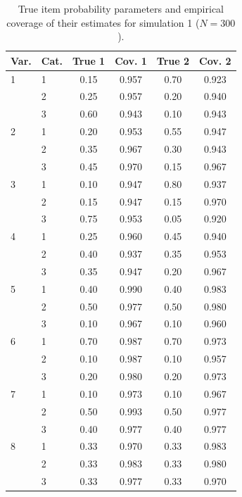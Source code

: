 \begin{table}[H]
\centering
\begin{tabular}{llcccc}
  \toprule
\textbf{Var.} & \textbf{Cat.} & \textbf{True 1} & \textbf{Cov. 1} & \textbf{True 2} & \textbf{Cov. 2} \\ 
  \midrule
1 & 1 & 0.15 & 0.957 & 0.70 & 0.923 \\ 
   & 2 & 0.25 & 0.957 & 0.20 & 0.940 \\ 
   & 3 & 0.60 & 0.943 & 0.10 & 0.943 \\ 
  2 & 1 & 0.20 & 0.953 & 0.55 & 0.947 \\ 
   & 2 & 0.35 & 0.967 & 0.30 & 0.943 \\ 
   & 3 & 0.45 & 0.970 & 0.15 & 0.967 \\ 
  3 & 1 & 0.10 & 0.947 & 0.80 & 0.937 \\ 
   & 2 & 0.15 & 0.947 & 0.15 & 0.970 \\ 
   & 3 & 0.75 & 0.953 & 0.05 & 0.920 \\ 
  4 & 1 & 0.25 & 0.960 & 0.45 & 0.940 \\ 
   & 2 & 0.40 & 0.937 & 0.35 & 0.953 \\ 
   & 3 & 0.35 & 0.947 & 0.20 & 0.967 \\ 
  5 & 1 & 0.40 & 0.990 & 0.40 & 0.983 \\ 
   & 2 & 0.50 & 0.977 & 0.50 & 0.980 \\ 
   & 3 & 0.10 & 0.967 & 0.10 & 0.960 \\ 
  6 & 1 & 0.70 & 0.987 & 0.70 & 0.973 \\ 
   & 2 & 0.10 & 0.987 & 0.10 & 0.957 \\ 
   & 3 & 0.20 & 0.980 & 0.20 & 0.973 \\ 
  7 & 1 & 0.10 & 0.973 & 0.10 & 0.967 \\ 
   & 2 & 0.50 & 0.993 & 0.50 & 0.977 \\ 
   & 3 & 0.40 & 0.977 & 0.40 & 0.977 \\ 
  8 & 1 & 0.33 & 0.970 & 0.33 & 0.983 \\ 
   & 2 & 0.33 & 0.983 & 0.33 & 0.980 \\ 
   & 3 & 0.33 & 0.977 & 0.33 & 0.970 \\ 
   \bottomrule
\end{tabular}
\caption{True item probability parameters and empirical coverage of their estimates for simulation 1 ($N = 300$).} 
\label{table:sim1_item_prob_coverage_N300}
\end{table}
